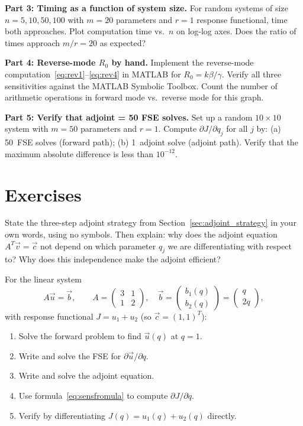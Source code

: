 \textbf{Part 3: Timing as a function of system size.}
For random systems of size $n = 5, 10, 50, 100$ with $m = 20$
parameters and $r = 1$ response functional, time both approaches.
Plot computation time vs.\ $n$ on log-log axes.
Does the ratio of times approach $m/r = 20$ as expected?

\textbf{Part 4: Reverse-mode $R_0$ by hand.}
Implement the reverse-mode computation~\eqref{eq:rev1}--\eqref{eq:rev4}
in MATLAB for $R_0 = k\beta/\gamma$.
Verify all three sensitivities against the MATLAB Symbolic Toolbox.
Count the number of arithmetic operations in forward mode
vs.\ reverse mode for this graph.

\textbf{Part 5: Verify that adjoint = 50 FSE solves.}
Set up a random $10\times10$ system with $m = 50$ parameters and $r = 1$.
Compute $\partial J/\partial q_j$ for all $j$ by:
(a) 50~FSE solves (forward path); (b) 1~adjoint solve (adjoint path).
Verify that the maximum absolute difference is less than $10^{-12}$.

\section{Exercises}

\begin{exercise}[\bloom{L2}]
\label{ex:ch5:strategy}
State the three-step adjoint strategy from Section~\ref{sec:adjoint_strategy}
in your own words, using no symbols.
Then explain: why does the adjoint equation $A^T\vec{v} = \vec{c}$ not
depend on which parameter $q_j$ we are differentiating with respect to?
Why does this independence make the adjoint efficient?
\end{exercise}

\begin{exercise}[\bloom{L3}]
\label{ex:ch5:2x2}
For the linear system
\[
  A\vec{u} = \vec{b}, \qquad
  A = \begin{pmatrix} 3 & 1 \\ 1 & 2 \end{pmatrix}, \quad
  \vec{b} = \begin{pmatrix} b_1(q) \\ b_2(q) \end{pmatrix}
  = \begin{pmatrix} q \\ 2q \end{pmatrix},
\]
with response functional $J = u_1 + u_2$ (so $\vec{c} = (1,1)^T$):
\begin{enumerate}[label=(\alph*)]
  \item Solve the forward problem to find $\vec{u}(q)$ at $q = 1$.
  \item Write and solve the FSE for $\partial\vec{u}/\partial q$.
  \item Write and solve the adjoint equation.
  \item Use formula~\eqref{eq:sensfromula} to compute $\partial J/\partial q$.
  \item Verify by differentiating $J(q) = u_1(q) + u_2(q)$ directly.
\end{enumerate}
\end{exercise}

